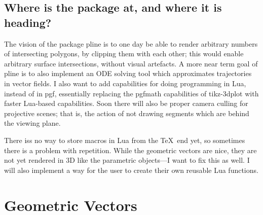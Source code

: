 \documentclass[12pt]{report}
\begin{document}
        \section{Where is the package at, and where it is heading?}
            The vision of the package pline is to one 
            day be able to render arbitrary numbers of intersecting 
            polygons, by clipping them with each other; this would 
            enable arbitrary surface intersections, without 
            visual artefacts. A more near term goal of 
            pline is to also implement an ODE 
            solving tool which approximates trajectories in 
            vector fields. I also want to add capabilities for 
            doing programming in Lua, instead of in pgf,
            essentially replacing the pgfmath capabilities of 
            tikz-3dplot with faster Lua-based capabilities.
            Soon there will also be proper camera culling for 
            projective scenes; that is, the action of not drawing 
            segments which are behind the viewing plane.\par 
            There iss no way  to store macros in Lua from the \TeX\      
            end yet, so sometimes there is a problem with 
            repetition. While the geometric vectors are nice,
            they are not yet rendered in 3D like the parametric 
            objects---I want to fix this as well.
            I will also implement a way for the user to create 
            their own reusable Lua functions.
    \chapter{Geometric Vectors}
\end{document}
